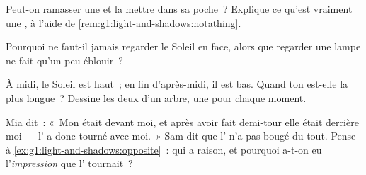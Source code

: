 \begin{exercise}[$\star$]\label{exo:g1:light-and-shadows:6}
Peut-on ramasser une  et la mettre dans sa poche~? Explique ce
qu'est vraiment une , à l'aide de
\cref{rem:g1:light-and-shadows:notathing}.
\end{exercise}

\begin{exercise}[$\star$]\label{exo:g1:light-and-shadows:7}
Pourquoi ne faut-il jamais regarder le Soleil en face, alors que
regarder une lampe ne fait qu'un peu éblouir~?
\end{exercise}

\begin{exercise}[$\star$]\label{exo:g1:light-and-shadows:8}
À midi, le Soleil est haut~; en fin d'après-midi, il est bas. Quand
ton  est-elle la plus longue~? Dessine les deux  d'un
arbre, une pour chaque moment.
\end{exercise}

\begin{exercise}[$\star\star$]\label{exo:g1:light-and-shadows:9}
Mia dit~: «~Mon  était devant moi, et après avoir fait demi-tour
elle était derrière moi --- l' a donc tourné avec moi.~» Sam dit
que l' n'a pas bougé du tout. Pense à
\cref{ex:g1:light-and-shadows:opposite}~: qui a raison, et pourquoi
a-t-on eu l'\emph{impression} que l' tournait~?
\end{exercise}
